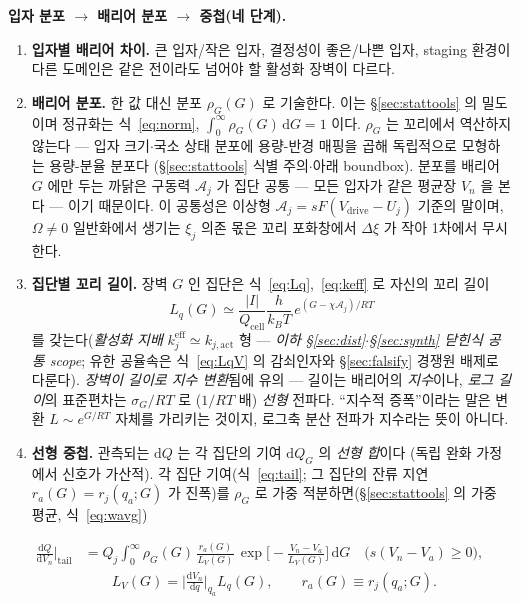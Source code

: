 \documentclass[11pt,a4paper]{article}
\newcommand{\dd}{\mathrm{d}}
\newcommand{\eff}{\mathrm{eff}}
\newcommand{\drive}{\mathrm{drive}}
\newcommand{\cell}{\mathrm{cell}}
\begin{document}
\textbf{입자 분포 $\to$ 배리어 분포 $\to$ 중첩(네 단계).}
\begin{enumerate}[label=\textbf{(\alph*)},leftmargin=2.2em,itemsep=2pt]
\item \textbf{입자별 배리어 차이.} 큰 입자/작은 입자, 결정성이 좋은/나쁜 입자, staging 환경이 다른 도메인은
  같은 전이라도 넘어야 할 활성화 장벽이 다르다.
\item \textbf{배리어 분포.} 한 값 대신 분포 $\rho_G(G)$ 로 기술한다. 이는 \S\ref{sec:stattools} 의 밀도이며
  정규화는 식~\eqref{eq:norm}, $\int_0^\infty\rho_G(G)\,\dd G=1$ 이다. $\rho_G$ 는 꼬리에서 역산하지 않는다 —
  입자 크기$\cdot$국소 상태 분포에 용량-반경 매핑을 곱해 독립적으로 모형하는 용량-분율 분포다
  (\S\ref{sec:stattools} 식별 주의$\cdot$아래 boundbox). 분포를 배리어 $G$ 에만 두는 까닭은 구동력
  $\mathcal A_j$ 가 집단 공통 — 모든 입자가 같은 평균장 $V_n$ 을 본다 — 이기 때문이다. 이 공통성은 이상형
  $\mathcal A_j=sF(V_\drive-U_j)$ 기준의 말이며, $\Omega\ne0$ 일반화에서 생기는 $\xi_j$ 의존 몫은 꼬리
  포화창에서 $\Delta\xi$ 가 작아 1차에서 무시한다.
\item \textbf{집단별 꼬리 길이.} 장벽 $G$ 인 집단은 식~\eqref{eq:Lq},~\eqref{eq:keff} 로 자신의 꼬리 길이
  \begin{equation*}
  L_{q}(G)\simeq\frac{|I|}{Q_\cell}\frac{h}{k_BT}\,e^{(G-\chi\mathcal A_j)/RT}
  \end{equation*}
  를 갖는다(\emph{활성화 지배}
  $k_j^{\eff}\simeq k_{j,\mathrm{act}}$ 형 — \emph{이하 \S\ref{sec:dist}$\cdot$\S\ref{sec:synth} 닫힌식 공통 scope};
  유한 공율속은 식~\eqref{eq:LqV} 의 감쇠인자와 \S\ref{sec:falsify} 경쟁원 배제로 다룬다). \emph{장벽이 길이로
  지수 변환}됨에 유의 — 길이는 배리어의 \emph{지수}이나, \emph{로그 길이}의 표준편차는 $\sigma_G/RT$ 로 ($1/RT$ 배)
  \emph{선형} 전파다. ``지수적 증폭''이라는 말은 변환 $L\!\sim\!e^{G/RT}$ 자체를 가리키는 것이지, 로그축 분산
전파가 지수라는 뜻이 아니다.
\item \textbf{선형 중첩.} 관측되는 $\dd Q$ 는 각 집단의 기여 $\dd Q_G$ 의 \emph{선형 합}이다
  (독립 완화 가정에서 신호가 가산적). 각 집단 기여(식~\eqref{eq:tail}; 그 집단의 잔류 지연 $r_a(G)=r_j(q_a;G)$ 가
  진폭)를 $\rho_G$ 로 가중 적분하면(\S\ref{sec:stattools} 의 가중 평균, 식~\eqref{eq:wavg})
\end{enumerate}
\begin{equation}
\boxed{\;\begin{aligned}
\frac{\dd Q}{\dd V_n}\Big|_{\text{tail}}&=Q_j\!\int_0^\infty\!\rho_G(G)\,\frac{r_a(G)}{L_V(G)}\,
\exp\!\Big[-\frac{V_n-V_a}{L_V(G)}\Big]\,\dd G\quad\big(s(V_n-V_a)\ge0\big),\\[2pt]
&\qquad L_V(G)=\Big|\frac{\dd V_n}{\dd q}\Big|_{q_a}\!\!L_q(G),\qquad r_a(G)\equiv r_j(q_a;G).
\end{aligned}\;}
\label{eq:superpose}
\end{equation}
\end{document}
